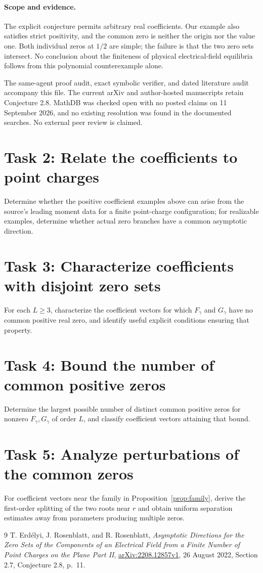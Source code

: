 \documentclass[11pt]{article}
\begin{document}
\paragraph{Scope and evidence.}
The explicit conjecture permits arbitrary real coefficients. Our example
also satisfies strict positivity, and the common zero is neither the origin
nor the value one. Both individual zeros at $1/2$ are simple; the failure is
that the two zero sets intersect. No conclusion about the finiteness of
physical electrical-field equilibria follows from this polynomial
counterexample alone.

The same-agent proof audit, exact symbolic verifier, and dated literature
audit accompany this file. The current arXiv and author-hosted manuscripts
retain Conjecture 2.8. MathDB was checked open with no posted claims on
11 September 2026, and no existing resolution was found in the documented
searches. No external peer review is claimed.

\section*{Task 2: Relate the coefficients to point charges}
Determine whether the positive coefficient examples above can arise from
the source's leading moment data for a finite point-charge configuration;
for realizable examples, determine whether actual zero branches have a
common asymptotic direction.

\section*{Task 3: Characterize coefficients with disjoint zero sets}
For each $L\geq3$, characterize the coefficient vectors for which
$F_\gamma$ and $G_\gamma$ have no common positive real zero, and identify
useful explicit conditions ensuring that property.

\section*{Task 4: Bound the number of common positive zeros}
Determine the largest possible number of distinct common positive zeros
for nonzero $F_\gamma,G_\gamma$ of order $L$, and classify coefficient
vectors attaining that bound.

\section*{Task 5: Analyze perturbations of the common zeros}
For coefficient vectors near the family in Proposition~\ref{prop:family},
derive the first-order splitting of the two roots near $r$ and obtain
uniform separation estimates away from parameters producing multiple zeros.

\begin{thebibliography}{9}
 T. Erd\'elyi, J. Rosenblatt, and R. Rosenblatt,
\emph{Asymptotic Directions for the Zero Sets of the Components of an
Electrical Field from a Finite Number of Point Charges on the Plane Part II},
\href{https://arxiv.org/abs/2208.12857}{arXiv:2208.12857v1}, 26 August 2022,
Section 2.7, Conjecture 2.8, p.~11.
\end{thebibliography}
\end{document}
